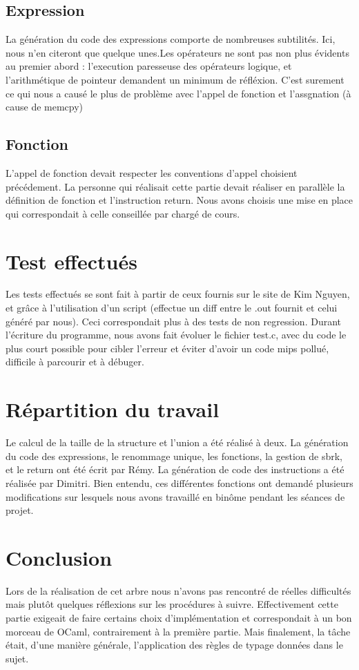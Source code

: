 \documentclass[a4paper]{report} \usepackage[utf8]{inputenc}
\begin{document}
\subsection{Expression}


La génération du code des expressions comporte de nombreuses subtilités. Ici, nous n’en citeront que quelque unes.Les opérateurs ne sont pas non plus évidents au premier abord : l’execution paresseuse des opérateurs logique, et l’arithmétique de pointeur demandent un minimum de réfléxion. C’est surement ce qui nous a causé le plus de problème avec l’appel de fonction et l’assgnation (à cause de memcpy)

\subsection{Fonction}


L’appel de fonction devait respecter les conventions d’appel choisient précédement. La personne qui réalisait cette partie devait réaliser en parallèle la définition de fonction et l’instruction return. Nous avons choisis une mise en place qui correspondait à celle conseillée par chargé de cours.  

\section{Test effectués}
Les tests effectués se sont fait à partir de ceux fournis sur le site de Kim Nguyen, et grâce à l’utilisation d’un script (effectue un diff entre le .out fournit et celui généré par nous). Ceci correspondait plus à des tests de non regression. Durant l’écriture du programme, nous avons fait évoluer le fichier test.c, avec du code le plus court possible pour cibler l’erreur et éviter d’avoir un code mips pollué, difficile à parcourir et à débuger.

\section{Répartition du travail}
Le calcul de la taille de la structure et l’union a été réalisé à deux. La génération du code des expressions, le renommage unique, les fonctions, la gestion de sbrk, et le return ont été écrit par Rémy. La génération de code des instructions a été réalisée par Dimitri. Bien entendu, ces différentes fonctions ont demandé plusieurs modifications sur lesquels nous avons travaillé en binôme pendant les séances de projet.


\section*{Conclusion}
Lors de la réalisation de cet arbre nous n’avons pas rencontré
de réelles difficultés mais plutôt quelques réflexions sur les
procédures à suivre. Effectivement cette partie exigeait de faire
certains choix d'implémentation et correspondait à un bon morceau de
OCaml, contrairement à la première partie. Mais finalement, la tâche
était, d'une manière générale, l'application des règles de typage données
dans le sujet.
\end{document}
